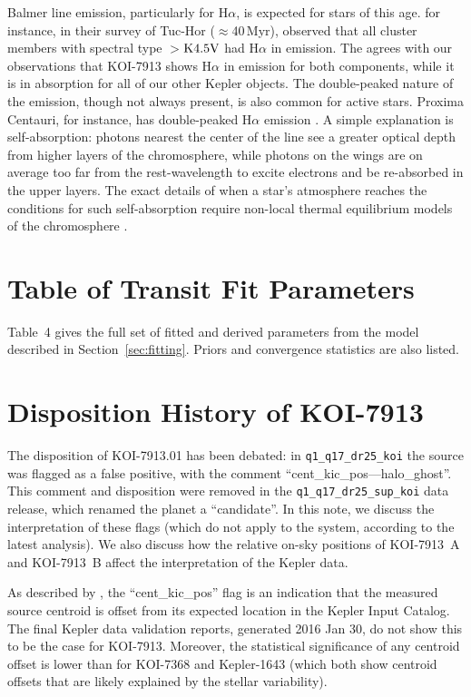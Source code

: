 \documentclass[12pt,twocolumn]{aastex63}
\begin{document}
Balmer line emission, particularly for H$\alpha$, is expected for
stars of this age.  \citet{kraus_stellar_2014} for instance, in their
survey of Tuc-Hor ($\approx$40\,Myr), observed that all
cluster members with spectral type $>$${\rm K4.5V}$ had H$\alpha$ in
emission.  The agrees with our observations that KOI-7913 shows
H$\alpha$ in emission for both components, while it is in absorption
for all of our other Kepler objects.  The double-peaked nature of the
emission, though not always present, is also common for
active stars.  Proxima Centauri, for instance, has double-peaked
H$\alpha$ emission \citep{collins_calculations_2017}.  A simple
explanation is self-absorption: photons nearest the center of the line
see a greater optical depth from higher layers of the chromosphere,
while photons on the wings are on average too far from the
rest-wavelength to excite electrons and be re-absorbed in the upper
layers.  The exact details of when a star's atmosphere reaches the
conditions for such self-absorption require non-local thermal
equilibrium models of the chromosphere
\citep{short_chromospheric_1998,2005A&A...439.1137F}.


\section{Table of Transit Fit Parameters}
\label{app:transit}

Table~4 gives the full set of fitted and derived
parameters from the model described in Section~\ref{sec:fitting}.
Priors and convergence statistics are also listed.


\section{Disposition History of KOI-7913}
\label{app:koi7913}

The disposition of KOI-7913.01 has been debated: in
\texttt{q1\_q17\_dr25\_koi} the source was flagged as a false
positive, with the comment ``cent\_kic\_pos---halo\_ghost''.  This
comment and disposition were removed in the
\texttt{q1\_q17\_dr25\_sup\_koi} data release, which renamed the
planet a ``candidate''.  In this note, we discuss the interpretation
of these flags (which do not apply to the system, according to the
latest analysis).  We also discuss how the relative on-sky positions of
KOI-7913~A and KOI-7913~B affect the interpretation of the Kepler
data.

As described by \citet{thompson_planetary_2018}, the
``cent\_kic\_pos'' flag is an indication that the measured source
centroid is offset from its expected location in the Kepler Input
Catalog.  The final Kepler data validation reports, generated 2016 Jan
30, do not show this to be the case for KOI-7913.  Moreover, the
statistical significance of any centroid offset is lower than for
KOI-7368 and Kepler-1643 (which both show centroid offsets that are
likely explained by the stellar variability).
\end{document}
